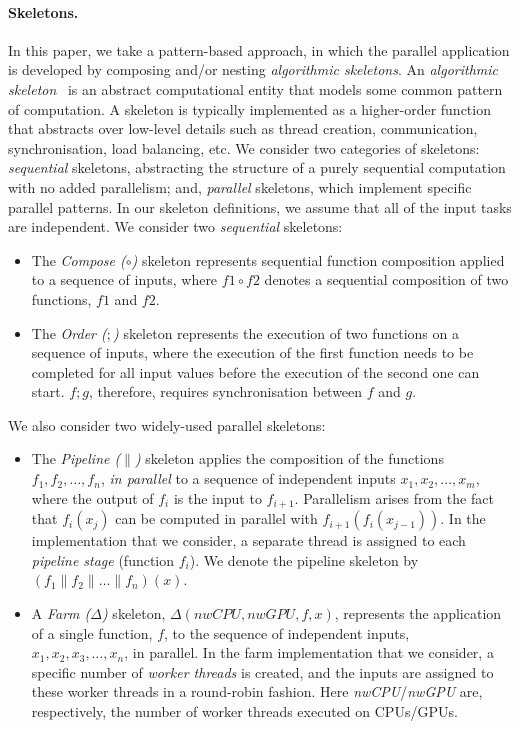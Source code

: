 \documentclass[smallextended]{svjour3}
\begin{document}
\paragraph{Skeletons.} In this paper, we take a pattern-based approach, in which the parallel application is developed
by composing and/or nesting \emph{algorithmic skeletons}. An \emph{algorithmic skeleton}~\cite{cole-th} is an abstract
computational entity that models some common pattern of computation. %
A skeleton is typically implemented as a higher-order function that abstracts over low-level details such as 
thread creation, communication, synchronisation, load balancing, etc.
We consider two categories of skeletons: \emph{sequential} skeletons, abstracting
the structure of a purely sequential computation with no added parallelism; and, \emph{parallel}
skeletons, which implement specific parallel patterns. In our skeleton definitions, we assume
that all of the input tasks are independent.
We consider two \emph{sequential} skeletons:
\begin{itemize}
\item The \emph{Compose ($\circ$)} skeleton represents sequential
  function composition applied to a sequence of inputs, where
$f1 \circ f2$ denotes a sequential composition of two functions, $f1$ and $f2$.
\item The \emph{Order ($;$)} skeleton represents the execution of two
 functions on a sequence of inputs, where the execution of the first function needs to be
 completed for all input values before the execution of the second one
 can start. $f ; g$, therefore, requires synchronisation
 between $f$ and $g$.
\end{itemize}

We also consider two widely-used parallel skeletons:
\begin{itemize}
\item The \emph{Pipeline ($\parallel$)} skeleton applies
    the composition
    of the functions \\ $f_1, f_2, \dots, f_n$, \emph{in parallel} to a sequence of independent inputs
   $x_1,x_2,\dots,x_m$, where the output of $f_i$ is the input to
   $f_{i+1}$. Parallelism arises from the fact that
   $f_i(x_j)$ can be computed in parallel with
   $f_{i+1}(f_i(x_{j-1}))$. In the implementation that we
   consider, a separate thread is assigned to each
   \emph{pipeline stage} (function $f_i$).
   We denote the pipeline skeleton by
    $(f_1 \parallel f_2 \parallel \dots \parallel f_n)(x) $.
\item A \emph{Farm ($\Delta$)} skeleton,  $\Delta(\mathit{nwCPU},\mathit{nwGPU},f,x)$, represents the application of a single function,
  $f$, to the sequence of independent inputs,\\ 
  $x_1,x_2,x_3,\dots,x_n$, in parallel. In the farm implementation
  that we consider, a specific number of
  \emph{worker threads} is created, and the inputs are assigned to
  these worker threads in a round-robin fashion.  
 Here \emph{nwCPU}/\emph{nwGPU} are, respectively, the number of worker
  threads executed on CPUs/GPUs.
\end{itemize}
\end{document}
